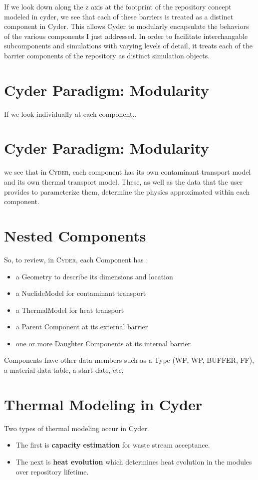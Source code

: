 \documentclass[letterpaper]{article}
\newcommand{\Cyder}{\textsc{Cyder}\xspace}
\begin{document}
If we look down along the z axis at the footprint of the repository concept 
modeled in cyder, we see that each of these barriers is treated as a distinct 
component in Cyder. This allows Cyder to modularly encapsulate the behaviors of 
the various components I just addressed. In order to facilitate interchangable 
subcomponents and simulations with varying levels of detail, it treats each of 
the barrier components of the repository as distinct simulation objects. 


\section{Cyder Paradigm: Modularity}

If we look individually at each component..

\section{Cyder Paradigm: Modularity}

we see that in \Cyder , each component has its own contaminant transport model 
and its own thermal transport model. These, as well as the data that the user 
provides to parameterize them, determine the physics approximated within each 
component. 

\section{Nested Components}
So, to review, in \Cyder , each Component has : 
  \begin{itemize}
    \item a Geometry to describe its dimensions and location
    \item a NuclideModel for contaminant transport 
    \item a ThermalModel for heat transport
    \item a Parent Component at its external barrier
    \item one or more Daughter Components at its internal barrier
  \end{itemize}

  Components have other data members such as a Type (WF, WP, BUFFER, FF), a 
  material data table, a start date, etc. 

\section{Thermal Modeling in Cyder}
Two types of thermal modeling occur in Cyder. 
\begin{itemize}
\item The first is \textbf{capacity estimation} for waste stream acceptance.
\item The next is \textbf{heat evolution} which determines heat evolution in 
the modules over repository lifetime.
\end{itemize}
\end{document}
